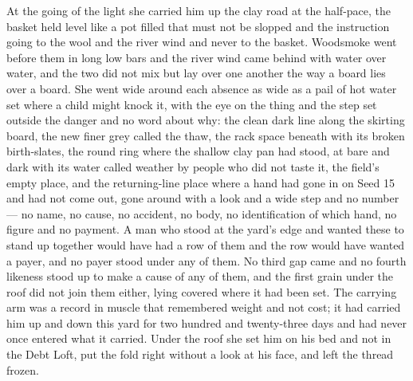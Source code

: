 At the going of the light she carried him up the clay road at the half-pace, the basket held level like a pot filled that must not be slopped and the instruction going to the wool and the river wind and never to the basket. Woodsmoke went before them in long low bars and the river wind came behind with water over water, and the two did not mix but lay over one another the way a board lies over a board. She went wide around each absence as wide as a pail of hot water set where a child might knock it, with the eye on the thing and the step set outside the danger and no word about why: the clean dark line along the skirting board, the new finer grey called the thaw, the rack space beneath  with its broken birth-slates, the round ring where the shallow clay pan had stood,  at  bare and dark with its water called weather by people who did not taste it, the field's empty place, and the returning-line place where a hand had gone in on Seed 15 and had not come out, gone around with a look and a wide step and no number --- no name, no cause, no accident, no body, no identification of which hand, no figure and no payment. A man who stood at the yard's edge and wanted these to stand up together would have had a row of them and the row would have wanted a payer, and no payer stood under any of them. No third gap came and no fourth likeness stood up to make a cause of any of them, and the first grain under the roof did not join them either, lying covered where it had been set. The carrying arm was a record in muscle that remembered weight and not cost; it had carried him up and down this yard for two hundred and twenty-three days and had never once entered what it carried. Under the roof she set him on his bed and not in the Debt Loft, put the fold right without a look at his face, and left the thread frozen.

\scenebreak

